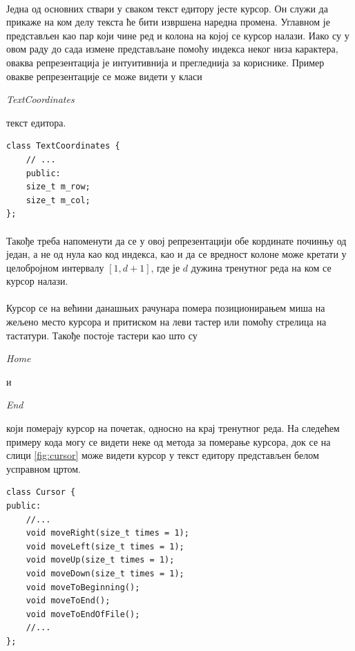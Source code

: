 \documentclass[12pt,oneside]{memoir}
\begin{document}
\paragraph{}
Једна од основних ствари у сваком текст едитору јесте курсор. Он служи да прикаже
на ком делу текста ће бити извршена наредна промена. Углавном је представљен као пар
који чине ред и колона на којој се курсор налази. Иако су у овом раду до сада измене
представљане помоћу индекса неког низа карактера, оваква репрезентација је
интуитивнија и прегледнија за кориснике. Пример овакве репрезентације се може видети
у класи \begin{latinica}\textit{TextCoordinates}\end{latinica} текст едитора.

\begin{verbatim}
class TextCoordinates {
	// ...
	public:
	size_t m_row;
	size_t m_col;
};
\end{verbatim}

\paragraph{}
Такође треба напоменути да се у овој репрезентацији обе кординате починњу од
један, а не од нула као код индекса, као и да се вредност колоне може кретати
у целобројном интервалу \([1, d+1]\), где је \(d\) дужина тренутног реда на ком се
курсор налази.

\paragraph{}
Курсор се на већини данашњих рачунара помера позиционирањем миша на жељено место курсора
и притиском на леви тастер или помоћу стрелица на тастатури. Такође постоје тастери као што су
\begin{latinica}\textit{Home}\end{latinica} и \begin{latinica}\textit{End}\end{latinica}
који померају курсор на почетак, односно на крај тренутног реда. На следећем примеру кода
могу се видети неке од метода за померање курсора, док се на слици \ref{fig:cursor}
може видети курсор у текст едитору представљен белом усправном цртом.

\begin{verbatim}
class Cursor {
public:
	//...
	void moveRight(size_t times = 1);
	void moveLeft(size_t times = 1);
	void moveUp(size_t times = 1);
	void moveDown(size_t times = 1);
	void moveToBeginning();
	void moveToEnd();
	void moveToEndOfFile();
	//...
};
\end{verbatim}
\end{document}
